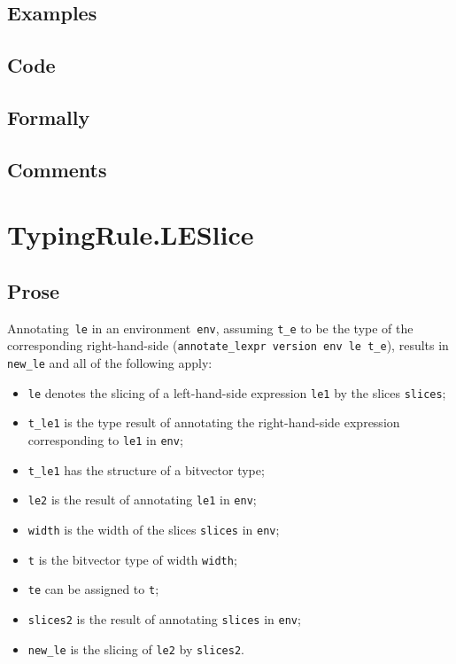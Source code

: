 \documentclass{book}
\begin{document}
  \subsection{Examples}

  \subsection{Code}

  \subsection{Formally}

  \subsection{Comments}

\section{TypingRule.LESlice \label{sec:TypingRule.LESlice}}

  \subsection{Prose}
   Annotating~\texttt{le} in an environment~\texttt{env}, assuming
\texttt{t\_e} to be the type of the corresponding right-hand-side
(\texttt{annotate\_lexpr version env le t\_e}), results in \texttt{new\_le} and
all of the following apply:
   \begin{itemize}
   \item \texttt{le} denotes the slicing of a left-hand-side expression \texttt{le1} by the slices \texttt{slices};
   \item \texttt{t\_le1} is the type result of annotating the right-hand-side expression corresponding to \texttt{le1} in \texttt{env};
   \item \texttt{t\_le1} has the structure of a bitvector type;
   \item \texttt{le2} is the result of annotating \texttt{le1} in \texttt{env};
   \item \texttt{width} is the width of the slices \texttt{slices} in \texttt{env};
   \item \texttt{t} is the bitvector type of width \texttt{width};
   \item \texttt{te} can be assigned to \texttt{t};
   \item \texttt{slices2} is the result of annotating \texttt{slices} in \texttt{env};
   \item \texttt{new\_le} is the slicing of \texttt{le2} by \texttt{slices2}.
   \end{itemize}
 
\end{document}

